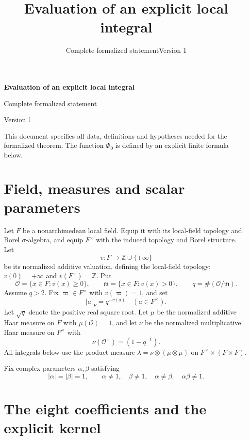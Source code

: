 \documentclass[11pt,a4paper]{article}
\title{Evaluation of an explicit local integral}
\author{}
\date{Complete formalized statement\quad\textnormal{Version 1}}
\newcommand{\Z}{\mathbb Z}
\newcommand{\OO}{\mathcal O}
\newcommand{\mm}{\mathfrak m}
\newcommand{\abs}[1]{\lvert#1\rvert}
\newcommand{\Ph}{\Phi_0}
\begin{document}
\thispagestyle{empty}
\begin{center}
{\LARGE\bfseries Evaluation of an explicit local integral}\par\vspace{7pt}
{\large Complete formalized statement}\par\vspace{4pt}
{Version 1}
\end{center}
\vspace{5pt}

This document specifies all data, definitions and hypotheses needed for the
formalized theorem. The function $\Ph$ is defined by an explicit finite formula below.


\section{Field, measures and scalar parameters}

Let $F$ be a nonarchimedean local field. Equip it with its local-field topology
and Borel $\sigma$-algebra, and equip $F^\times$ with the induced topology and
Borel structure. Let
\[
 v:F\longrightarrow\Z\cup\{+\infty\}
\]
be its normalized additive valuation, defining the local-field topology:
$v(0)=+\infty$ and
$v(F^\times)=\Z$. Put
\[
 \OO=\{x\in F:v(x)\ge0\},\qquad
 \mm=\{x\in F:v(x)>0\},\qquad q=\#(\OO/\mm).
\]
Assume $q>2$. Fix $\varpi\in F^\times$ with $v(\varpi)=1$, and set
\[
 \abs a_F=q^{-v(a)}\quad(a\in F^\times).
\]
Let $\sqrt q$ denote the positive real square root. Let $\mu$ be the normalized
additive Haar measure on $F$ with $\mu(\OO)=1$, and let $\nu$ be the normalized
multiplicative Haar measure on $F^\times$ with
\[
 \nu(\OO^\times)=(1-q^{-1}).
\]
 All integrals below
use the product measure $\lambda=\nu\otimes(\mu\otimes\mu)$ on
$F^\times\times(F\times F)$.

Fix complex parameters $\alpha,\beta$ satisfying 
\begin{equation}\label{eq:regular}
 \abs\alpha=\abs\beta=1,\qquad
 \alpha\ne1,\quad\beta\ne1,\quad\alpha\ne\beta,\quad\alpha\beta\ne1.
\end{equation}


\clearpage
\section{The eight coefficients and the explicit kernel}
\end{document}
